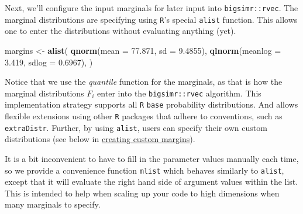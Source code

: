 \documentclass[]{article}
\newenvironment{Shaded}{\begin{snugshade}}{\end{snugshade}}
\newcommand{\DataTypeTok}[1]{\textcolor[rgb]{0.13,0.29,0.53}{#1}}
\newcommand{\DecValTok}[1]{\textcolor[rgb]{0.00,0.00,0.81}{#1}}
\newcommand{\FloatTok}[1]{\textcolor[rgb]{0.00,0.00,0.81}{#1}}
\newcommand{\KeywordTok}[1]{\textcolor[rgb]{0.13,0.29,0.53}{\textbf{#1}}}
\newcommand{\NormalTok}[1]{#1}
\newcommand{\OperatorTok}[1]{\textcolor[rgb]{0.81,0.36,0.00}{\textbf{#1}}}
\newcommand{\StringTok}[1]{\textcolor[rgb]{0.31,0.60,0.02}{#1}}
\begin{document}
Next, we'll configure the input marginals for later input into \texttt{bigsimr::rvec}.
The marginal distributions are specifying using \texttt{R}'s special \texttt{alist} function.
This allows one to enter the distributions without evaluating anything (yet).

\begin{Shaded}
\begin{Highlighting}[]
\NormalTok{margins <-}\StringTok{ }\KeywordTok{alist}\NormalTok{(}
    \KeywordTok{qnorm}\NormalTok{(}\DataTypeTok{mean =} \FloatTok{77.871}\NormalTok{, }\DataTypeTok{sd =} \FloatTok{9.4855}\NormalTok{),}
    \KeywordTok{qlnorm}\NormalTok{(}\DataTypeTok{meanlog =} \FloatTok{3.419}\NormalTok{, }\DataTypeTok{sdlog =} \FloatTok{0.6967}\NormalTok{),}
\NormalTok{)}
\end{Highlighting}
\end{Shaded}

Notice that we use the \emph{quantile} function for the marginals, as that is how the marginal distributions \(F_i\) enter into the \texttt{bigsimr::rvec} algorithm.
This implementation strategy supports all \texttt{R} \texttt{base} probability distributions.
And allows flexible extensions using other \texttt{R} packages that adhere to conventions, such as \texttt{extraDistr}.
Further, by using \texttt{alist}, users can specify their own custom distributions (see below in \protect\hyperlink{custom-margins}{creating custom margins}).

It is a bit inconvenient to have to fill in the parameter values manually each time, so we provide a convenience function \texttt{mlist} which behaves similarly to \texttt{alist}, except that it will evaluate the right hand side of argument values within the list.
This is intended to help when scaling up your code to high dimensions when many marginals to specify.

\begin{Shaded}
\end{Shaded}
\end{document}
